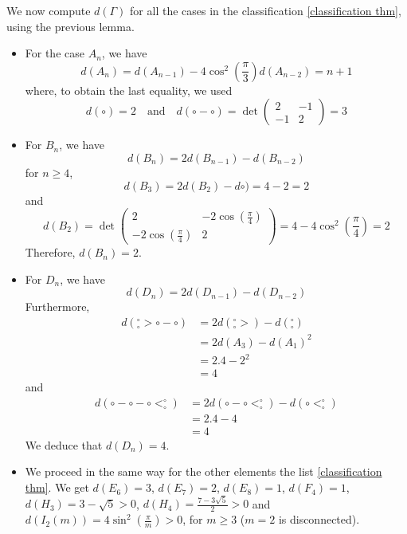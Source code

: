 We now compute $d(\Gamma)$ for all the cases in the classification \ref{classification thm}, using the previous lemma.

\begin{itemize}
\item For the case $A_n$, we have
\begin{equation}
d(A_n) = d(A_{n-1} ) - 4 \cos^2 \left(\frac{\pi}{3} \right) d(A_{n-2}) = n+1
\end{equation} where, to obtain the last equality, we used
\begin{equation}
d(\circ) =2 \quad \text{and} \quad d(\circ-\circ) = \det \begin{pmatrix}
2 &-1 \\
-1 &2
\end{pmatrix} = 3
\end{equation}
\item For $B_n$, we have
\begin{equation}
d(B_n) = 2 d(B_{n-1} ) - d (B_{n-2})
\end{equation} for $n\ge 4$,
\begin{equation}
d(B_3) = 2 d (B_2) - d \circ) = 4-2 = 2
\end{equation} and
\begin{equation}
d(B_2) = \det \begin{pmatrix}
2 &-2 \cos \left(\frac{\pi}{4} \right) \\
-2 \cos \left( \frac{\pi}{4} \right) & 2
\end{pmatrix} = 4 - 4 \cos^2 \left( \frac{\pi}{4} \right) = 2
\end{equation} Therefore, $d(B_n) = 2$.
\item For $D_n$, we have
\begin{equation}
d (D_n) = 2 d(D_{n-1}) - d (D_{n-2})
\end{equation} Furthermore,
\begin{equation}
\begin{split}
d( {}^\circ_\circ > \circ - \circ ) &= 2 d(  {}^\circ_\circ > ) - d ( {}^\circ_\circ) \\
&= 2 d(A_3) - d (A_1)^2 \\
&= 2 . 4 - 2^2 \\
&= 4
\end{split}
\end{equation} and
\begin{equation}
\begin{split}
d(\circ - \circ - \circ < ^\circ_\circ ) &= 2 d (\circ - \circ < ^\circ_\circ ) - d (\circ < ^\circ_\circ) \\
&= 2 .4 - 4 \\
&= 4
\end{split}
\end{equation} We deduce that $d(D_n) = 4$.
\item We proceed in the same way for the other elements the list \ref{classification thm}. We get $d(E_6) = 3$, $d(E_7) = 2$, $d(E_8) = 1$, $d(F_4) = 1$, $d(H_3) = 3 - \sqrt{5} > 0$, $d(H_4) = \frac{7 - 3 \sqrt{5}}{2} > 0$ and $d(I_2 (m) ) = 4 \sin^2 \left( \frac{\pi}{m} \right) > 0$, for $m \ge 3$ ($m= 2$ is disconnected).

\end{itemize}

